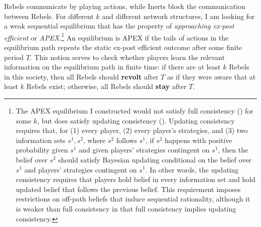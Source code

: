 \documentclass[12pt,letter]{article}
\theoremstyle{definition}
\theoremstyle{definition}
\theoremstyle{remark}
\theoremstyle{claim}
\begin{document}
Rebels communicate by playing actions, while Inerts block the communication between Rebels. For different $k$ and different network structures, I am looking for a weak sequential equilibrium that has the property of \textit{approaching ex-post efficient} or \textit{APEX}.\footnote{The APEX equilibrium I constructed would not satisfy full consistency (\citep{Krep_Wilson1982}) for some $k$, but does satisfy {updating consistency} (\citep{Perea2002}). Updating consistency requires that, for (1) every player, (2) every player's strategies, and (3) two information sets $s^1,s^2$, where $s^2$ follows $s^1$, if $s^2$ happens with positive probability given $s^1$ and given players' strategies contingent on $s^1$, then the belief over $s^2$ should satisfy Bayesian updating conditional on the belief over $s^1$ and players' strategies contingent on $s^1$. In other words, the updating consistency requires that players hold belief in every information set and hold updated belief that follows the previous belief. This requirement imposes restrictions on off-path beliefs that induce sequential rationality, although it is weaker than full consistency in that full consistency implies updating consistency.}
An equilibrium is APEX if the tails of actions in the equilibrium path repeats the static ex-post efficient outcome after some finite period $T$. This notion serves to check whether players learn the relevant information on the equilibrium path in finite time: if there are at least $k$ Rebels in this society, then {all} Rebels should \textbf{revolt} after $T$ as if they were aware that at least $k$ Rebels exist; otherwise, {all} Rebels should \textbf{stay} after $T$. 
\end{document}
